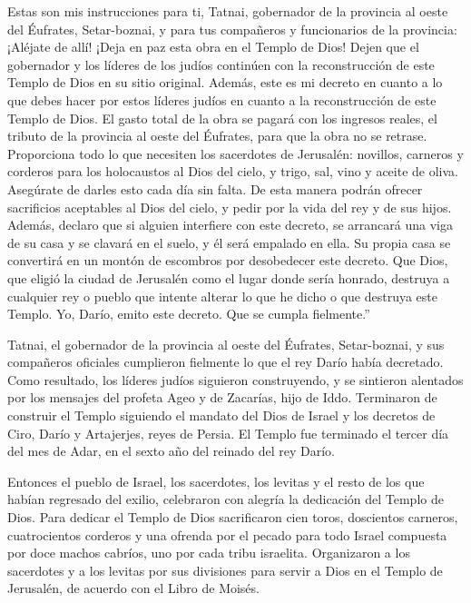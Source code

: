  Estas son mis instrucciones para ti, Tatnai, gobernador de
la provincia al oeste del Éufrates, Setar-boznai, y para tus compañeros
y funcionarios de la provincia: ¡Aléjate de allí!  ¡Deja en
paz esta obra en el Templo de Dios! Dejen que el gobernador y los
líderes de los judíos continúen con la reconstrucción de este Templo de
Dios en su sitio original.  Además, este es mi decreto en
cuanto a lo que debes hacer por estos líderes judíos en cuanto a la
reconstrucción de este Templo de Dios. El gasto total de la obra se
pagará con los ingresos reales, el tributo de la provincia al oeste del
Éufrates, para que la obra no se retrase.  Proporciona todo
lo que necesiten los sacerdotes de Jerusalén: novillos, carneros y
corderos para los holocaustos al Dios del cielo, y trigo, sal, vino y
aceite de oliva. Asegúrate de darles esto cada día sin falta.
 De esta manera podrán ofrecer sacrificios aceptables al
Dios del cielo, y pedir por la vida del rey y de sus hijos.
 Además, declaro que si alguien interfiere con este
decreto, se arrancará una viga de su casa y se clavará en el suelo, y él
será empalado en ella. Su propia casa se convertirá en un montón de
escombros por desobedecer este decreto.  Que Dios, que
eligió la ciudad de Jerusalén como el lugar donde sería honrado,
destruya a cualquier rey o pueblo que intente alterar lo que he dicho o
que destruya este Templo. Yo, Darío, emito este decreto. Que se cumpla
fielmente.''

 Tatnai, el gobernador de la provincia al oeste del
Éufrates, Setar-boznai, y sus compañeros oficiales cumplieron fielmente
lo que el rey Darío había decretado.  Como resultado, los
líderes judíos siguieron construyendo, y se sintieron alentados por los
mensajes del profeta Ageo y de Zacarías, hijo de Iddo. Terminaron de
construir el Templo siguiendo el mandato del Dios de Israel y los
decretos de Ciro, Darío y Artajerjes, reyes de Persia.  El
Templo fue terminado el tercer día del mes de Adar, en el sexto año del
reinado del rey Darío.

 Entonces el pueblo de Israel, los sacerdotes, los levitas
y el resto de los que habían regresado del exilio, celebraron con
alegría la dedicación del Templo de Dios.  Para dedicar el
Templo de Dios sacrificaron cien toros, doscientos carneros,
cuatrocientos corderos y una ofrenda por el pecado para todo Israel
compuesta por doce machos cabríos, uno por cada tribu israelita.
 Organizaron a los sacerdotes y a los levitas por sus
divisiones para servir a Dios en el Templo de Jerusalén, de acuerdo con
el Libro de Moisés.

